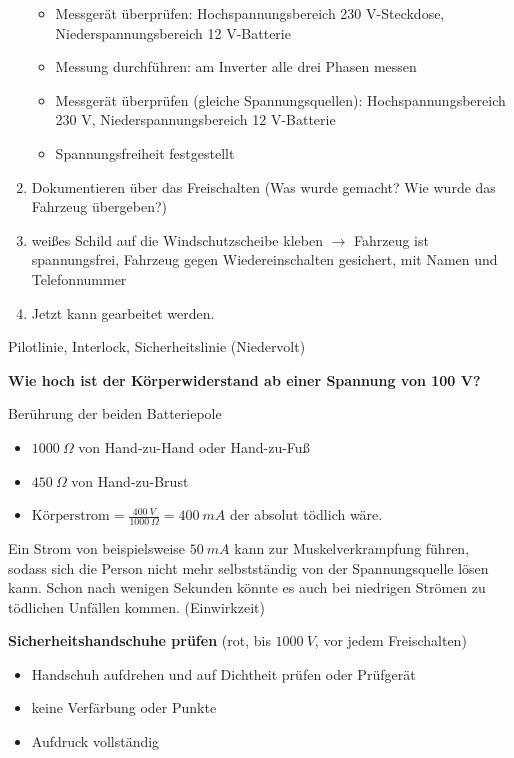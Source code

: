 \begin{enumerate}
  \begin{itemize}
  \item
    Messgerät überprüfen: Hochspannungsbereich 230 V-Steckdose,
    Niederspannungsbereich 12 V-Batterie
  \item
    Messung durchführen: am Inverter alle drei Phasen messen
  \item
    Messgerät überprüfen (gleiche Spannungsquellen):
    Hochspannungsbereich 230 V, Niederspannungsbereich 12 V-Batterie
  \item
    Spannungsfreiheit festgestellt
  \end{itemize}
\item
  Dokumentieren über das Freischalten (Was wurde gemacht? Wie wurde das
  Fahrzeug übergeben?)
\item
  weißes Schild auf die Windschutzscheibe kleben $\to$ Fahrzeug ist
  spannungsfrei, Fahrzeug gegen Wiedereinschalten gesichert, mit Namen
  und Telefonnummer
\item
  Jetzt kann gearbeitet werden.
\end{enumerate}

Pilotlinie, Interlock, Sicherheitslinie (Niedervolt)

\textbf{Wie hoch ist der Körperwiderstand ab einer Spannung von 100 V?}

Berührung der beiden Batteriepole

\begin{itemize}
\item
  $1000~\Omega$ von Hand-zu-Hand oder Hand-zu-Fuß
\item
  $450~\Omega$ von Hand-zu-Brust
\item
  $\text{Körperstrom} = \frac{400~V}{1000~\Omega} = 400~mA$ der
  absolut tödlich wäre.
\end{itemize}

Ein Strom von beispielsweise $50~mA$ kann zur Muskelverkrampfung
führen, sodass sich die Person nicht mehr selbstständig von der
Spannungsquelle lösen kann. Schon nach wenigen Sekunden könnte es auch
bei niedrigen Strömen zu tödlichen Unfällen kommen. (Einwirkzeit)

\textbf{Sicherheitshandschuhe prüfen} (rot, bis $1000~V$, vor jedem
Freischalten)

\begin{itemize}
\item
  Handschuh aufdrehen und auf Dichtheit prüfen oder Prüfgerät
\item
  keine Verfärbung oder Punkte
\item
  Aufdruck vollständig
\end{itemize}
